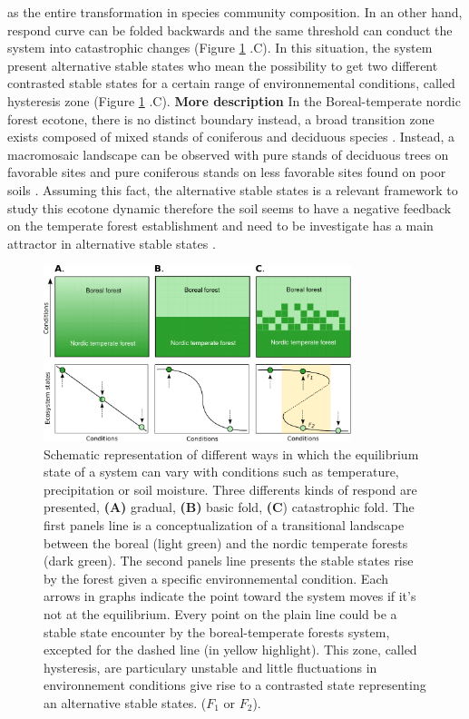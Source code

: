 as the entire transformation in species community composition. In an other
hand, respond curve can be folded backwards and the same threshold can conduct
the system into catastrophic changes (Figure \ref{fig1} .C). In this
situation, the system present alternative stable states who mean the
possibility to get two different contrasted stable states for a certain range
of environnemental conditions, called hysteresis zone (Figure \ref{fig1} .C).
\textbf{More description} In the Boreal-temperate nordic forest ecotone, there
is no distinct boundary instead, a broad transition zone exists composed of
mixed stands of coniferous and deciduous species \cite{Goldblum2010}. Instead,
a macromosaic landscape can be observed with pure stands of deciduous trees on
favorable sites and pure coniferous stands on less favorable sites found on
poor soils \cite{Goldblum2010}. Assuming this fact, the alternative stable
states is a relevant framework to study this ecotone dynamic therefore the
soil seems to have a negative feedback on the temperate forest establishment
and need to be investigate has a main attractor in alternative stable states
\cite{Kellman2004,Moore2008,DeFrenne2013,Barras1998}. \\

\begin{figure}[t]       
	\begin{center}
		\includegraphics[width=0.8\textwidth]{fig/states.pdf}       
	\end{center}
	\caption{Schematic representation of different ways in which the equilibrium
	state of a system can vary with conditions such as temperature, precipitation
	or soil moisture. Three differents kinds of respond are presented,
	\textbf{(A)} gradual, \textbf{(B)} basic fold, \textbf{(C}) catastrophic fold.
	The first panels line is a conceptualization of a transitional landscape
	between the boreal (light green) and the nordic temperate forests (dark
	green). The second panels line presents the stable states rise by the forest
	given a specific environnemental condition. Each arrows in graphs indicate the
	point toward the system moves if it's not at the equilibrium. Every point on
	the plain line could be a stable state encounter by the boreal-temperate
	forests system, excepted for the dashed line (in yellow highlight). This zone,
	called hysteresis, are particulary unstable and little fluctuations in
	environnement conditions give rise to a contrasted state representing an
	alternative stable states.  ($F_1$ or $F_2$).}
		\label{fig1}
\end{figure}

